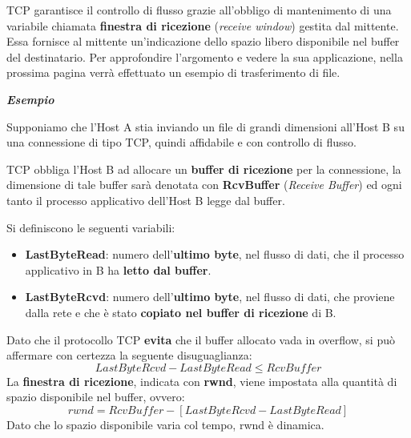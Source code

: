 \documentclass[a4paper]{article}
\begin{document}
	\noindent
	TCP garantisce il controllo di flusso grazie all’obbligo di mantenimento di una variabile chiamata \textcolor{Red3}{\textbf{finestra di ricezione}} (\emph{receive window}) gestita dal mittente. Essa fornisce al mittente un’indicazione dello spazio libero disponibile nel buffer del destinatario. Per approfondire l’argomento e vedere la sua applicazione, nella prossima pagina verrà effettuato un esempio di trasferimento di file.
	\newpage
	
	\begin{center}
		\large
		\textcolor{Green4}{\textbf{\emph{Esempio}}}
	\end{center}

	\noindent
	Supponiamo che l’\textsf{Host A} stia inviando un file di grandi dimensioni all’\textsf{Host B} su una connessione di tipo TCP, quindi affidabile e con controllo di flusso.\newline
	
	\noindent
	TCP obbliga l’\textsf{Host B} ad allocare un \textbf{buffer di ricezione} per la connessione, la dimensione di tale buffer sarà denotata con \textbf{\textsf{RcvBuffer}} (\emph{Receive Buffer}) ed ogni tanto il processo applicativo dell’\textsf{Host B} legge dal buffer.\newline
	
	\noindent
	Si definiscono le seguenti variabili:
	\begin{itemize}
		\item \textbf{\textsf{LastByteRead}}: numero dell'\textbf{ultimo byte}, nel flusso di dati, che il processo applicativo in B ha \textbf{letto dal buffer}.

		\item \textbf{\textsf{LastByteRcvd}}: numero dell'\textbf{ultimo byte}, nel flusso di dati, che proviene dalla rete e che è stato \textbf{copiato nel buffer di ricezione} di B.
	\end{itemize}
	Dato che il protocollo TCP \textbf{evita} che il buffer allocato vada in overflow, si può affermare con certezza la seguente disuguaglianza:
	\begin{equation*}
		LastByteRcvd - LastByteRead \le RcvBuffer
	\end{equation*}
	La \textbf{finestra di ricezione}, indicata con \textbf{\textsf{rwnd}}, viene impostata alla quantità di spazio disponibile nel buffer, ovvero:
	\begin{equation*}
		rwnd = RcvBuffer - \left[LastByteRcvd - LastByteRead\right]
	\end{equation*}
	Dato che lo spazio disponibile varia col tempo, \textsf{rwnd} è dinamica.\newline
	
\end{document}
